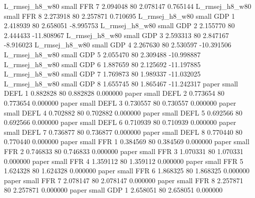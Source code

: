 L_rmsej_h8_w80      small      FFR                 7 2.094048 80       2.078147           0.765144
L_rmsej_h8_w80      small      FFR                 8 2.273918 80       2.257871           0.710695
L_rmsej_h8_w80      small      GDP                 1 2.418939 80       2.658051          -8.995753
L_rmsej_h8_w80      small      GDP                 2 2.155770 80       2.444433         -11.808967
L_rmsej_h8_w80      small      GDP                 3 2.593313 80       2.847167          -8.916023
L_rmsej_h8_w80      small      GDP                 4 2.267630 80       2.530597         -10.391506
L_rmsej_h8_w80      small      GDP                 5 2.055470 80       2.309488         -10.998887
L_rmsej_h8_w80      small      GDP                 6 1.887659 80       2.125692         -11.197885
L_rmsej_h8_w80      small      GDP                 7 1.769873 80       1.989337         -11.032025
L_rmsej_h8_w80      small      GDP                 8 1.655745 80       1.865467         -11.242317
         paper      small     DEFL                 1 0.882828 80       0.882828           0.000000
         paper      small     DEFL                 2 0.773654 80       0.773654           0.000000
         paper      small     DEFL                 3 0.730557 80       0.730557           0.000000
         paper      small     DEFL                 4 0.702882 80       0.702882           0.000000
         paper      small     DEFL                 5 0.692566 80       0.692566           0.000000
         paper      small     DEFL                 6 0.710939 80       0.710939           0.000000
         paper      small     DEFL                 7 0.736877 80       0.736877           0.000000
         paper      small     DEFL                 8 0.770440 80       0.770440           0.000000
         paper      small      FFR                 1 0.384569 80       0.384569           0.000000
         paper      small      FFR                 2 0.746833 80       0.746833           0.000000
         paper      small      FFR                 3 1.070331 80       1.070331           0.000000
         paper      small      FFR                 4 1.359112 80       1.359112           0.000000
         paper      small      FFR                 5 1.624328 80       1.624328           0.000000
         paper      small      FFR                 6 1.868325 80       1.868325           0.000000
         paper      small      FFR                 7 2.078147 80       2.078147           0.000000
         paper      small      FFR                 8 2.257871 80       2.257871           0.000000
         paper      small      GDP                 1 2.658051 80       2.658051           0.000000
